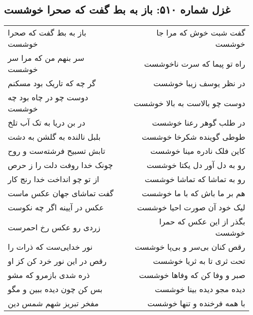 \begin{center}
\section*{غزل شماره ۵۱۰: باز به بط گفت که صحرا خوشست}
\label{sec:0510}
\begin{longtable}{l p{0.5cm} r}
باز به بط گفت که صحرا خوشست
&&
گفت شبت خوش که مرا جا خوشست
\\
سر بنهم من که مرا سر خوشست
&&
راه تو پیما که سرت ناخوشست
\\
گر چه که تاریک بود مسکنم
&&
در نظر یوسف زیبا خوشست
\\
دوست چو در چاه بود چه خوشست
&&
دوست چو بالاست به بالا خوشست
\\
در بن دریا به تک آب تلخ
&&
در طلب گوهر رعنا خوشست
\\
بلبل نالنده به گلشن به دشت
&&
طوطی گوینده شکرخا خوشست
\\
تابش تسبیح فرشته‌ست و روح
&&
کاین فلک نادره مینا خوشست
\\
چونک خدا روفت دلت را ز حرص
&&
رو به دل آور دل یکتا خوشست
\\
از تو چو انداخت خدا رنج کار
&&
رو به تماشا که تماشا خوشست
\\
گفت تماشای جهان عکس ماست
&&
هم بر ما باش که با ما خوشست
\\
عکس در آیینه اگر چه نکوست
&&
لیک خود آن صورت احیا خوشست
\\
زردی رو عکس رخ احمرست
&&
بگذر از این عکس که حمرا خوشست
\\
نور خدایی‌ست که ذرات را
&&
رقص کنان بی‌سر و بی‌پا خوشست
\\
رقص در این نور خرد کن کز او
&&
تحت ثری تا به ثریا خوشست
\\
ذره شدی بازمرو که مشو
&&
صبر و وفا کن که وفاها خوشست
\\
بس کن چون دیده ببین و مگو
&&
دیده مجو دیده بینا خوشست
\\
مفخر تبریز شهم شمس دین
&&
با همه فرخنده و تنها خوشست
\\
\end{longtable}
\end{center}
